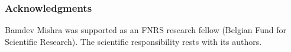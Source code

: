 \documentclass{article} %
\begin{document}
\subsubsection*{Acknowledgments}
Bamdev Mishra was supported as an FNRS research fellow (Belgian Fund for Scientific Research). The scientific responsibility rests with its authors.



\small
  



%
\end{document}
